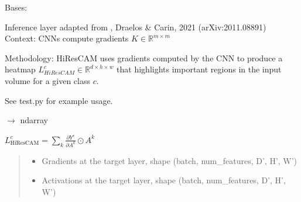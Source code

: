 \documentclass[letterpaper,10pt,english]{sphinxmanual}
\begin{document}
\begin{fulllineitems}
\label{\detokenize{hirescam:hirescam.HiResCam}}
\pysigstartsignatures
\pysiglinewithargsret
{}
{\sphinxparamcomma {}\sphinxparamcomma {}\sphinxparamcomma {}}
{}
\pysigstopsignatures
\sphinxAtStartPar
Bases: 

\sphinxAtStartPar
Inference layer adapted from , Draelos \& Carin, 2021 (arXiv:2011.08891)
Context: CNNs compute gradients \(K \in \mathbb{R}^{m \times m}\)

\sphinxAtStartPar
Methodology: HiResCAM uses gradients computed by the CNN to produce a heatmap \(L^c_{HiResCAM}
\in \mathbb{R}^{d \times h \times w}\) that highlights important regions in the input volume for a given class \(c\).

\sphinxAtStartPar
See test.py for example usage.

\begin{fulllineitems}
\label{\detokenize{hirescam:hirescam.HiResCam.hirescam}}
\pysigstartsignatures
\pysiglinewithargsret
{}
{\sphinxparamcomma {}}
{{ $\rightarrow$ ndarray}}
\pysigstopsignatures\begin{description}
\sphinxAtStartPar
\(L^c_{\text{HiResCAM}} = \sum_k \frac{\partial Y^c}{\partial A^k} \odot A^k\)

\end{description}
\begin{quote}\begin{description}
\begin{itemize}
\item {} 
\sphinxAtStartPar
{} \textendash{} Gradients at the target layer, shape (batch, num\_features, D’, H’, W’)

\item {} 
\sphinxAtStartPar
{} \textendash{} Activations at the target layer, shape (batch, num\_features, D’, H’, W’)


\end{itemize}
\end{description}
\end{quote}
\end{fulllineitems}
\end{fulllineitems}
\end{document}
